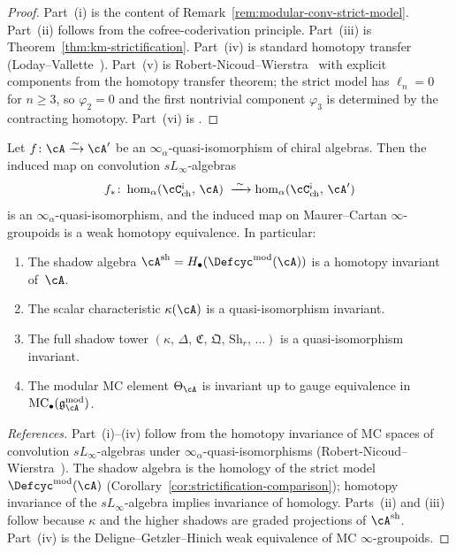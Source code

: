 \begin{proof}
Part~(i) is the content of
Remark~\ref{rem:modular-conv-strict-model}.
Part~(ii) follows from the cofree-coderivation principle.
Part~(iii) is Theorem~\ref{thm:km-strictification}.
Part~(iv) is standard homotopy transfer
(Loday--Vallette~\cite[Thm~10.3.1]{LV12}).
Part~(v) is Robert-Nicoud--Wierstra~\cite[Thm~5.1]{RNW19}
with explicit components from the homotopy transfer
theorem; the strict model has $\ell_n = 0$ for $n \geq 3$,
so $\varphi_2 = 0$ and the first nontrivial component
$\varphi_3$ is determined by the contracting homotopy.
Part~(vi) is \cite[Theorem~6.6]{RNW19}.
\end{proof}

\begin{theorem}
\label{thm:shadow-homotopy-invariance}
Let $f\colon \cA \xrightarrow{\sim} \cA'$ be an
$\infty_\alpha$-quasi-isomorphism of chiral algebras.  Then
the induced map on convolution $sL_\infty$-algebras
\[
f_*\colon
\operatorname{hom}_\alpha(\cC^{\textup{!`}}_{\mathrm{ch}},\, \cA)
\;\xrightarrow{\;\sim\;}
\operatorname{hom}_\alpha(\cC^{\textup{!`}}_{\mathrm{ch}},\, \cA')
\]
is an $\infty_\alpha$-quasi-isomorphism, and the induced map on
Maurer--Cartan $\infty$-groupoids is a weak homotopy equivalence.
In particular:
\begin{enumerate}[label=\textup{(\roman*)}]
\item The shadow algebra
  $\cA^{\mathrm{sh}} = H_\bullet(\Defcyc^{\mathrm{mod}}(\cA))$ is a
  homotopy invariant of~$\cA$.
\item The scalar characteristic $\kappa(\cA)$ is a
  quasi-isomorphism invariant.
\item The full shadow tower
  $(\kappa,\, \Delta,\, \mathfrak{C},\, \mathfrak{Q},\,
  \mathrm{Sh}_r,\, \ldots)$ is a quasi-isomorphism invariant.
\item The modular MC element $\Theta_\cA$ is invariant up to gauge
  equivalence in $\mathrm{MC}_\bullet(\mathfrak{g}_\cA^{\mathrm{mod}})$.
\end{enumerate}
\end{theorem}

\begin{proof}[References]
Part~(i)--(iv) follow from the homotopy invariance of MC spaces of
convolution $sL_\infty$-algebras under $\infty_\alpha$-quasi-isomorphisms
(Robert-Nicoud--Wierstra~\cite[Section~8]{RNW19}).  The shadow algebra is
the homology of the strict model $\Defcyc^{\mathrm{mod}}(\cA)$
(Corollary~\ref{cor:strictification-comparison}); homotopy invariance of the
$sL_\infty$-algebra implies invariance of homology.  Parts~(ii) and (iii)
follow because $\kappa$ and the higher shadows are graded projections
of $\cA^{\mathrm{sh}}$.  Part~(iv) is the Deligne--Getzler--Hinich
weak equivalence of MC $\infty$-groupoids.
\end{proof}

